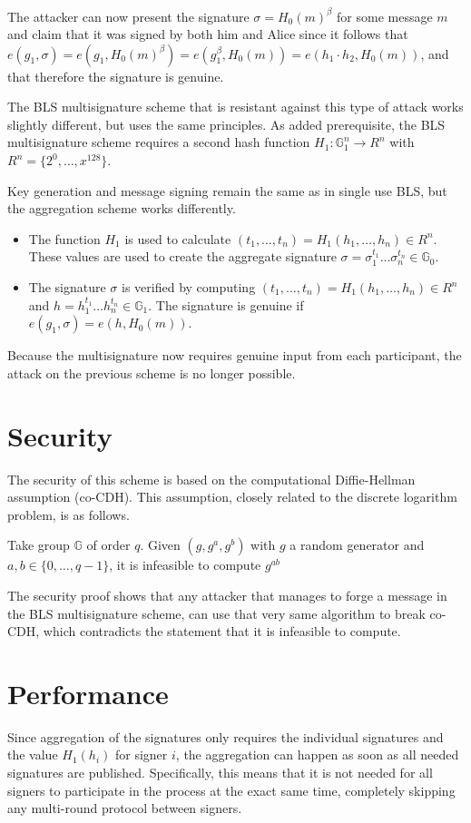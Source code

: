 The attacker can now present the signature $\sigma=H_0(m)^\beta$ for some message $m$ and claim that it was signed by both him and Alice since it follows that $e(g_1,\sigma)=e(g_1,H_0(m)^\beta)=e(g_1^\beta,H_0(m))=e(h_1\cdot h_2,H_0(m))$, and that therefore the signature is genuine.

The BLS multisignature scheme that is resistant against this type of attack works slightly different, but uses the same principles. As added prerequisite, the BLS multisignature scheme requires a second hash function $H_1:\mathbb{G}_1^n\to R^n$ with $R^n=\{2^0,\dots,x^128\}$.

Key generation and message signing remain the same as in single use BLS, but the aggregation scheme works differently.
\begin{itemize}
	\item The function $H_1$ is used to calculate $(t_1,\dots,t_n)=H_1(h_1,\dots,h_n)\in R^n$. These values are used to create the aggregate signature $\sigma=\sigma_1^{t_1}\dots\sigma_n^{t_n}\in\mathbb{G}_0$.
	\item The signature $\sigma$ is verified by computing $(t_1,\dots,t_n)=H_1(h_1,\dots,h_n)\in R^n$ and $h=h_1^{t_1}\dots h_n^{t_n}\in\mathbb{G}_1$. The signature is genuine if $e(g_1,\sigma)=e(h,H_0(m))$.
\end{itemize}
Because the multisignature now requires genuine input from each participant, the attack on the previous scheme is no longer possible.
\section{Security}
The security of this scheme is based on the computational Diffie-Hellman assumption (co-CDH). This assumption, closely related to the discrete logarithm problem, is as follows.
\begin{defn}
	Take group $\mathbb{G}$ of order $q$. Given $(g,g^a,g^b)$ with $g$ a random generator and $a,b\in\{0,\dots,q-1\}$, it is infeasible to compute $g^{ab}$
\end{defn}
The security proof shows that any attacker that manages to forge a message in the BLS multisignature scheme, can use that very same algorithm to break co-CDH, which contradicts the statement that it is infeasible to compute.
\section{Performance}
Since aggregation of the signatures only requires the individual signatures and the value $H_1(h_i)$ for signer $i$, the aggregation can happen as soon as all needed signatures are published. Specifically, this means that it is not needed for all signers to participate in the process at the exact same time, completely skipping any multi-round protocol between signers.

